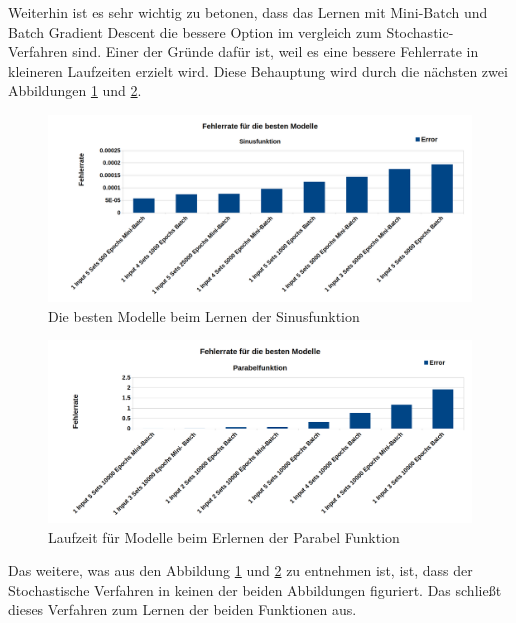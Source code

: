 {Weiterhin ist es sehr wichtig zu betonen, dass das Lernen mit Mini-Batch und Batch Gradient Descent die bessere Option im vergleich zum Stochastic-Verfahren sind. Einer der Gründe dafür ist, weil es eine bessere Fehlerrate in kleineren Laufzeiten erzielt wird. Diese Behauptung wird durch die nächsten zwei Abbildungen \ref{best_sinus} und \ref{best_parabola}.

\begin{figure}[htbp]
	\centering
	\includegraphics[width=1\textwidth]{images/charts/SinusFunktionbesteModelle_bold.png}
	\caption{Die besten Modelle beim Lernen der Sinusfunktion}
	\label{best_sinus}
\end{figure}

\begin{figure}[htbp]
	\centering
	\includegraphics[width=1\textwidth]{images/charts/ParabelFunktionbesteModelle_bold.png}
	\caption{Laufzeit für Modelle beim Erlernen der Parabel Funktion}
	\label{best_parabola}
\end{figure}

Das weitere, was aus den Abbildung \ref{best_sinus} und \ref{best_parabola} zu entnehmen ist, ist, dass der Stochastische Verfahren in keinen der beiden Abbildungen figuriert. Das schließt dieses Verfahren zum Lernen der beiden Funktionen aus.

}
